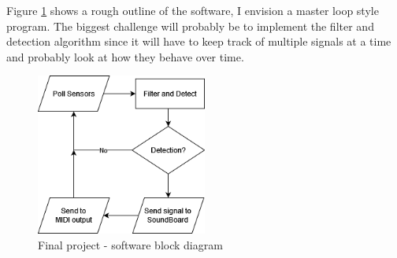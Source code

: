 \documentclass{article}
\begin{document}
Figure \ref{hw3:fig:software} shows a rough outline of the software, I envision a master loop style program. The biggest challenge will probably be to implement the filter and detection algorithm since it will have to keep track of multiple signals at a time and probably look at how they behave over time.


\begin{figure}[h]
    \centering
    \includegraphics[width=0.5\textwidth]{HW3/softwareblock.png}
    \caption{Final project - software block diagram}
    \label{hw3:fig:software}
\end{figure}
\end{document}
